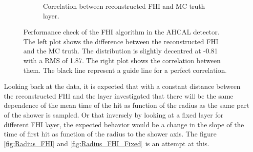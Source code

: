 \begin{figure}[htbp!]
\begin{subfigure}[t]{0.5\textwidth}
		\caption{Correlation between reconstructed FHI and MC truth layer.}\label{fig:Corr_FHI_RecoMC}
	\end{subfigure}
	\caption{Performance check of the FHI algorithm in the AHCAL detector. The left plot shows the difference between the reconstructed FHI and the MC truth. The distribution is slightly decentred at -0.81 with a RMS of 1.87. The right plot shows the correlation between them. The black line represent a guide line for a perfect correlation.}
	\label{fig:FHIAlgo}
\end{figure}

Looking back at the data, it is expected that with a constant distance between the reconstructed FHI and the layer investigated that there will be the same dependence of the mean time of the hit as function of the radius as the same part of the shower is sampled. Or that inversely by looking at a fixed layer for different FHI layer, the expected behavior would be a change in the slope of the time of first hit as function of the radius to the shower axis. The figure \ref{fig:Radius_FHI} and \ref{fig:Radius_FHI_Fixed} is an attempt at this.

